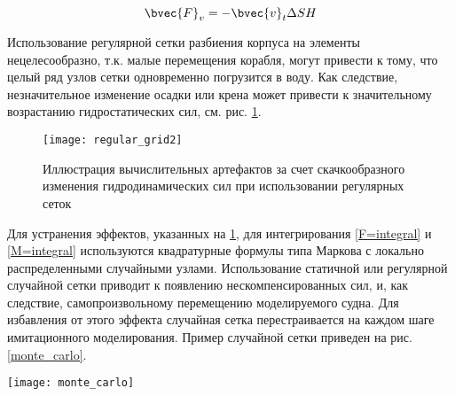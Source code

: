 \begin{equation}
	\bvec{F}_v = -\bvec{v}_t \Delta S H
\end{equation}





Использование регулярной сетки разбиения корпуса на элементы нецелесообразно, т.к. малые перемещения корабля, могут привести к тому, что целый ряд узлов сетки одновременно погрузится в воду. Как следствие, незначительное изменение осадки или крена может привести к значительному возрастанию гидростатических сил, см. рис. \ref{regular_grid}.

\begin{figure}[ht]
\begin{center}
\texttt{[image: regular\_grid2]}
\end{center}
\caption{Иллюстрация вычислительных артефактов за счет скачкообразного изменения гидродинамических сил при использовании регулярных сеток}
\label{regular_grid}
\end{figure}

Для устранения эффектов, указанных на \ref{regular_grid}, для интегрирования \eqref{F=integral} и \eqref{M=integral} используются квадратурные формулы типа Маркова с локально распределенными случайными узлами. Использование статичной или регулярной случайной сетки приводит к появлению нескомпенсированных сил, и, как следствие, самопроизвольному перемещению моделируемого судна. Для избавления от этого эффекта случайная сетка перестраивается на каждом шаге имитационного моделирования. Пример случайной сетки приведен на рис. \ref{monte_carlo}.

\begin{sidewaysfigure}[ht]
\begin{center}
\texttt{[image: monte\_carlo]}
\end{center}
\caption{Пример сетки с локально-распределенными случайными узлами}
\label{monte_carlo}
\end{sidewaysfigure}

